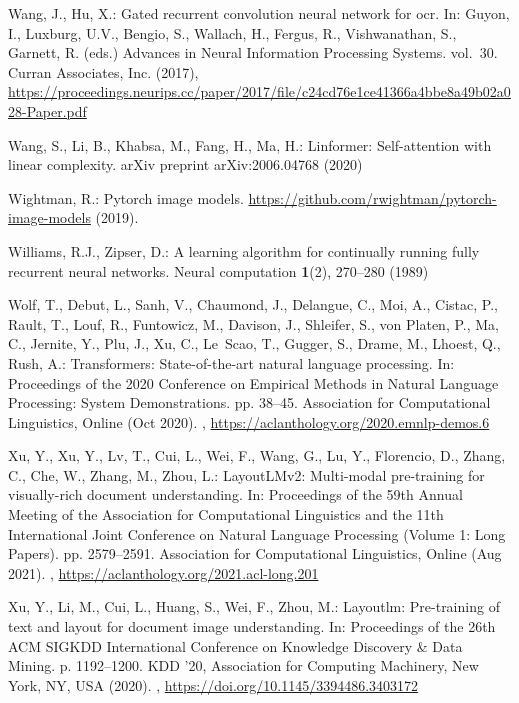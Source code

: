 \documentclass[runningheads]{llncs}
\begin{document}
\begin{thebibliography}{10}
Wang, J., Hu, X.: Gated recurrent convolution neural network for ocr. In:
  Guyon, I., Luxburg, U.V., Bengio, S., Wallach, H., Fergus, R., Vishwanathan,
  S., Garnett, R. (eds.) Advances in Neural Information Processing Systems.
  vol.~30. Curran Associates, Inc. (2017),
  \url{https://proceedings.neurips.cc/paper/2017/file/c24cd76e1ce41366a4bbe8a49b02a028-Paper.pdf}

Wang, S., Li, B., Khabsa, M., Fang, H., Ma, H.: Linformer: Self-attention with
  linear complexity. arXiv preprint arXiv:2006.04768  (2020)

Wightman, R.: Pytorch image models.
  \url{https://github.com/rwightman/pytorch-image-models} (2019).

Williams, R.J., Zipser, D.: A learning algorithm for continually running fully
  recurrent neural networks. Neural computation  \textbf{1}(2),  270--280
  (1989)

Wolf, T., Debut, L., Sanh, V., Chaumond, J., Delangue, C., Moi, A., Cistac, P.,
  Rault, T., Louf, R., Funtowicz, M., Davison, J., Shleifer, S., von Platen,
  P., Ma, C., Jernite, Y., Plu, J., Xu, C., Le~Scao, T., Gugger, S., Drame, M.,
  Lhoest, Q., Rush, A.: Transformers: State-of-the-art natural language
  processing. In: Proceedings of the 2020 Conference on Empirical Methods in
  Natural Language Processing: System Demonstrations. pp. 38--45. Association
  for Computational Linguistics, Online (Oct 2020).
  ,
  \url{https://aclanthology.org/2020.emnlp-demos.6}

Xu, Y., Xu, Y., Lv, T., Cui, L., Wei, F., Wang, G., Lu, Y., Florencio, D.,
  Zhang, C., Che, W., Zhang, M., Zhou, L.: {L}ayout{LM}v2: Multi-modal
  pre-training for visually-rich document understanding. In: Proceedings of the
  59th Annual Meeting of the Association for Computational Linguistics and the
  11th International Joint Conference on Natural Language Processing (Volume 1:
  Long Papers). pp. 2579--2591. Association for Computational Linguistics,
  Online (Aug 2021). ,
  \url{https://aclanthology.org/2021.acl-long.201}

Xu, Y., Li, M., Cui, L., Huang, S., Wei, F., Zhou, M.: Layoutlm: Pre-training
  of text and layout for document image understanding. In: Proceedings of the
  26th ACM SIGKDD International Conference on Knowledge Discovery \& Data
  Mining. p. 1192–1200. KDD '20, Association for Computing Machinery, New
  York, NY, USA (2020). ,
  \url{https://doi.org/10.1145/3394486.3403172}


\end{thebibliography}
\end{document}
